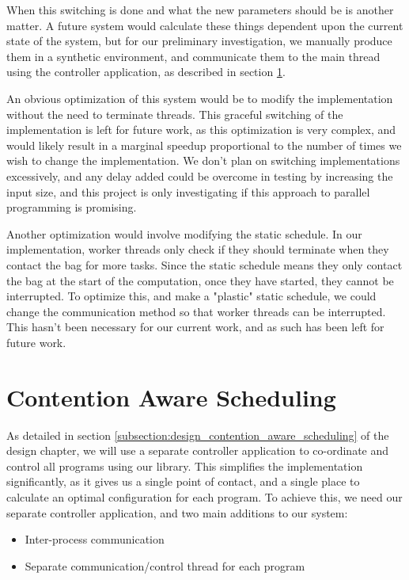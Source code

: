 When this switching is done and what the new parameters should be is another matter. A future system would calculate these things dependent upon the current state of the system, but for our preliminary investigation, we manually produce them in a synthetic environment, and communicate them to the main thread using the controller application, as described in section \ref{section:implementation_contention_aware_scheduling}.

An obvious optimization of this system would be to modify the implementation without the need to terminate threads. This graceful switching of the implementation is left for future work, as this optimization is very complex, and would likely result in a marginal speedup proportional to the number of times we wish to change the implementation. We don't plan on switching implementations excessively, and any delay added could be overcome in testing by increasing the input size, and this project is only investigating if this approach to parallel programming is promising.

Another optimization would involve modifying the static schedule. In our implementation, worker threads only check if they should terminate when they contact the bag for more tasks. Since the static schedule means they only contact the bag at the start of the computation, once they have started, they cannot be interrupted. To optimize this, and make a "plastic" static schedule, we could change the communication method so that worker threads can be interrupted. This hasn't been necessary for our current work, and as such has been left for future work.



\section{Contention Aware Scheduling}
\label{section:implementation_contention_aware_scheduling}

As detailed in section \ref{subsection:design_contention_aware_scheduling} of the design chapter, we will use a separate controller application to co-ordinate and control all programs using our library. This simplifies the implementation significantly, as it gives us a single point of contact, and a single place to calculate an optimal configuration for each program. To achieve this, we need our separate controller application, and two main additions to our system:

\begin{itemize}
	\item Inter-process communication
	\item Separate communication/control thread for each program
\end{itemize}

